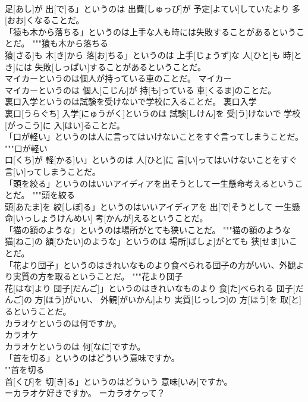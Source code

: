 \documentclass[8pt]{extreport}
\begin{document}
\begin{CJK}{UTF8}{min}
\\	足[あし]が 出[で]る」というのは 出費[しゅっぴ]が 予定[よてい]していたより 多[おお]くなることだ。
\\	「猿も木から落ちる」というのは上手な人も時には失敗することがあるということだ。	"""猿も木から落ちる
\\	猿[さる]も 木[き]から 落[お]ちる」というのは 上手[じょうず]な 人[ひと]も 時[とき]には 失敗[しっぱい]することがあるということだ。
\\	マイカーというのは個人が持っている車のことだ。	マイカー 
\\	マイカーというのは 個人[こじん]が 持[も]っている 車[くるま]のことだ。
\\	裏口入学というのは試験を受けないで学校に入ることだ。	裏口入学 
\\	裏口[うらぐち] 入学[にゅうがく]というのは 試験[しけん]を 受[う]けないで 学校[がっこう]に 入[はい]ることだ。
\\	「口が軽い」というのは人に言ってはいけないことをすぐ言ってしまうことだ。	"""口が軽い
\\	口[くち]が 軽[かる]い」というのは 人[ひと]に 言[い]ってはいけないことをすぐ 言[い]ってしまうことだ。
\\	「頭を絞る」というのはいいアイディアを出そうとして一生懸命考えるということだ。	"""頭を絞る
\\	頭[あたま]を 絞[しぼ]る」というのはいいアイディアを 出[で]そうとして 一生懸命[いっしょうけんめい] 考[かんが]えるということだ。
\\	「猫の額のような」というのは場所がとても狭いことだ。	"""猫の額のような
\\	猫[ねこ]の 額[ひたい]のような」というのは 場所[ばしょ]がとても 狭[せま]いことだ。
\\	「花より団子」というのはきれいなものより食べられる団子の方がいい、外観より実質の方を取るということだ。	"""花より団子
\\	花[はな]より 団子[だんご]」というのはきれいなものより 食[た]べられる 団子[だんご]の 方[ほう]がいい、 外観[がいかん]より 実質[じっしつ]の 方[ほう]を 取[と]るということだ。
\\	カラオケというのは何ですか。	
\\	カラオケ 
\\	カラオケというのは 何[なに]ですか。
\\	「首を切る」というのはどういう意味ですか。	
\\	""首を切る
\\	首[くび]を 切[き]る」というのはどういう 意味[いみ]ですか。
\\	ーカラオケ好きですか。 ーカラオケって？	

\end{CJK}
\end{document}

